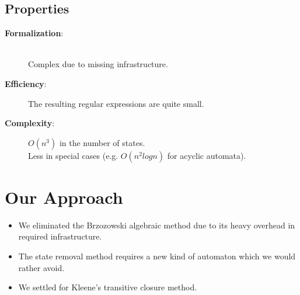 \documentclass{beamer}
\begin{document}
\subsection*{Properties}
\begin{frame}
    \begin{description}
        \item[\textbf{Formalization}:] \hfill \\
            Complex due to missing infrastructure.\\
        \item[\textbf{Efficiency}:] 
            The resulting regular expressions are quite small.\\

        \item[\textbf{Complexity}:]
            $O(n^3)$ in the number of states.\\
            Less in special cases (e.g. $O(n^2 log n)$ for acyclic automata).
    \end{description}
\end{frame}

\section{Our Approach}
\begin{frame}
    \begin{itemize}
        \item
           We eliminated the Brzozowski algebraic method due to its heavy overhead in required infrastructure.

        \pause

        \item
            The state removal method requires a new kind of automaton which we would rather avoid.

        \pause
            
        \item
            We settled for Kleene's transitive closure method.
           
   \end{itemize}
\end{frame}
\end{document}
